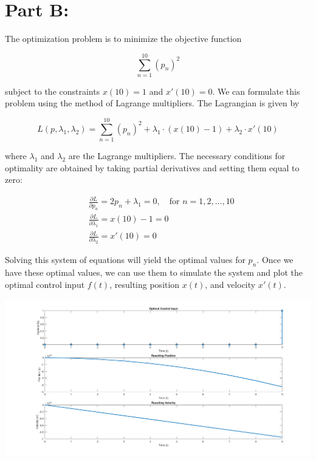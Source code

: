 \documentclass[20pt]{article}
\begin{document}
\section*{Part B:}


The optimization problem is to minimize the objective function

\[
    \sum_{n=1}^{10} (p_n)^2
\]

subject to the constraints \(x(10) = 1\) and \(x'(10) = 0\). We can formulate this problem using the method of Lagrange multipliers. The Lagrangian is given by

\[
    L(p, \lambda_1, \lambda_2) = \sum_{n=1}^{10} (p_n)^2 + \lambda_1 \cdot (x(10) - 1) + \lambda_2 \cdot x'(10)
\]

where \(\lambda_1\) and \(\lambda_2\) are the Lagrange multipliers. The necessary conditions for optimality are obtained by taking partial derivatives and setting them equal to zero:

\[
    \begin{aligned}
         & \frac{\partial L}{\partial p_n} = 2p_n + \lambda_1 = 0, \quad \text{for } n = 1, 2, \ldots, 10 \\
         & \frac{\partial L}{\partial \lambda_1} = x(10) - 1 = 0                                          \\
         & \frac{\partial L}{\partial \lambda_2} = x'(10) = 0
    \end{aligned}
\]

Solving this system of equations will yield the optimal values for \(p_n\). Once we have these optimal values, we can use them to simulate the system and plot the optimal control input \(f(t)\), resulting position \(x(t)\), and velocity \(x'(t)\).
 
\includegraphics[width=\textwidth]{partB.png}
\end{document}
